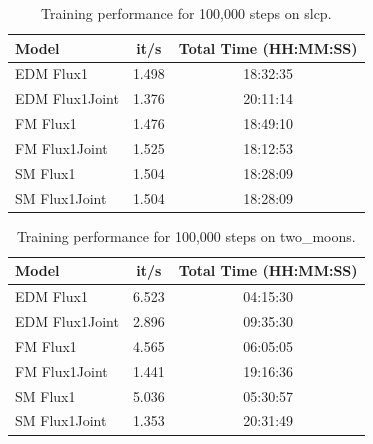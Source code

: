 \begin{table}[htbp]
  \centering
  \begin{tabular}{l c c}
    \toprule
    Model & it/s & Total Time (HH:MM:SS) \\
    \midrule
    EDM Flux1 & 1.498 & 18:32:35 \\
    EDM Flux1Joint & 1.376 & 20:11:14 \\
    FM Flux1 & 1.476 & 18:49:10 \\
    FM Flux1Joint & 1.525 & 18:12:53 \\
    SM Flux1 & 1.504 & 18:28:09 \\
    SM Flux1Joint & 1.504 & 18:28:09 \\
    \bottomrule
  \end{tabular}
  \caption{Training performance for 100,000 steps on slcp.}
  \label{tab:training_times_slcp}
\end{table}


\begin{table}[htbp]
  \centering
  \begin{tabular}{l c c}
    \toprule
    Model & it/s & Total Time (HH:MM:SS) \\
    \midrule
    EDM Flux1 & 6.523 & 04:15:30 \\
    EDM Flux1Joint & 2.896 & 09:35:30 \\
    FM Flux1 & 4.565 & 06:05:05 \\
    FM Flux1Joint & 1.441 & 19:16:36 \\
    SM Flux1 & 5.036 & 05:30:57 \\
    SM Flux1Joint & 1.353 & 20:31:49 \\
    \bottomrule
  \end{tabular}
  \caption{Training performance for 100,000 steps on two\_moons.}
  \label{tab:training_times_two_moons}
\end{table}


